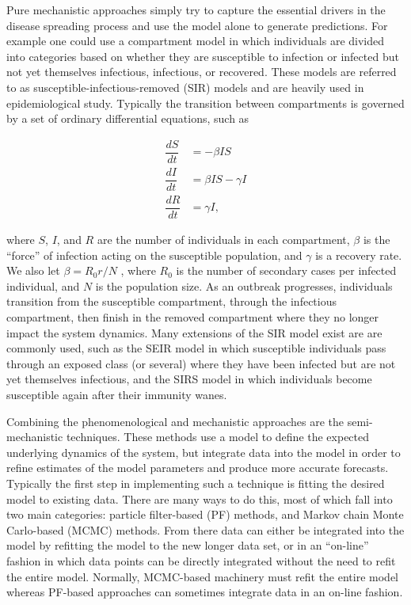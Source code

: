 Pure mechanistic approaches simply try to capture the essential drivers in the disease spreading process and use the model alone to generate predictions. For example one could use a compartment model in which individuals are divided into categories based on whether they are susceptible to infection or infected but not yet themselves infectious, infectious, or recovered. These models are referred to as susceptible-infectious-removed (SIR) models and are heavily used in epidemiological study. Typically the transition between compartments is governed by a set of ordinary differential equations, such as 

\begin{equation}\label{sirode}
    \begin{array}{rl}
        \dfrac{dS}{dt} & = - \beta I S \\
        \dfrac{dI}{dt} & = \beta I S - \gamma I  \\
        \dfrac{dR}{dt} & = \gamma I,
    \end{array}
\end{equation}

where $S$, $I$, and $R$ are the number of individuals in each compartment, $\beta$ is the ``force'' of infection acting on the susceptible population, and $\gamma$ is a recovery rate. We also let $\beta = R_0 r / N$ , where $R_0$ is the number of secondary cases per infected individual, and $N$ is the population size. As an outbreak progresses, individuals transition from the susceptible compartment, through the infectious compartment, then finish in the removed compartment where they no longer impact the system dynamics. Many extensions of the SIR model exist are are commonly used, such as the SEIR model in which susceptible individuals pass through an exposed class (or several) where they have been infected but are not yet themselves infectious, and the SIRS model in which individuals become susceptible again after their immunity wanes.

Combining the phenomenological and mechanistic approaches are the semi-mechanistic techniques. These methods use a model to define the expected underlying dynamics of the system, but integrate data into the model in order to refine estimates of the model parameters and produce more accurate forecasts. Typically the first step in implementing such a technique is fitting the desired model to existing data. There are many ways to do this, most of which fall into two main categories: particle filter-based (PF) methods, and Markov chain Monte Carlo-based (MCMC) methods. From there data can either be integrated into the model by refitting the model to the new longer data set, or in an ``on-line'' fashion in which data points can be directly integrated without the need to refit the entire model. Normally, MCMC-based machinery must refit the entire model whereas PF-based approaches can sometimes integrate data in an on-line fashion.

